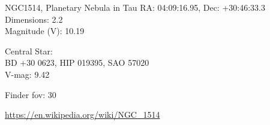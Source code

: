 \begin{block}{NGC1514, Planetary Nebula in Tau}
    RA: 04:09:16.95, Dec: +30:46:33.3 \\ 
    Dimensions: 2.2 \\ 
    Magnitude (V): 10.19

    Central Star: \\ 
      \hspace{1em}BD +30 0623, HIP 019395, SAO 57020 \\ 
      \hspace{1em}V-mag: 9.42 


    Finder fov: 30 

    \url{https://en.wikipedia.org/wiki/NGC_1514} 
\end{block}